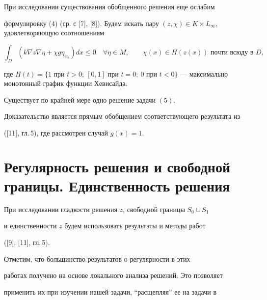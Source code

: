 При исследовании существования обобщенного решения еще ослабим


формулировку (4) (ср. с [7], [8]). Будем искать пару $(z,\chi) \in K


\times L_{\infty}$, удовлетворяющую соотношениям


\begin{equation}\label{5}


\int_D(k \nabla z \nabla \eta + \chi g \eta_{x_n}) dx \leq 0 \quad \forall


\eta \in M, \qquad \chi(x) \in H(z(x)) \text{ почти всюду в } D,


\end{equation}


где $H(t)=\{1\text{ при }t>0;\ [0,1]\text{ при }t=0;\ 0 \text{ при }


t<0 \}$ --- максимально монотонный график функции Хевисайда.





\begin{thm}


Существует по крайней мере одно решение задачи $(5)$.


\end{thm}





Доказательство является прямым обобщением соответствующего результата из


([11], гл.\,5), где рассмотрен случай $g(x) = 1$.





\section{Регулярность решения и свободной границы. Единственность решения}





При исследовании гладкости решения $z$, свободной границы $S_0 \cup S_1$


и единственности $z$ будем использовать результаты и методы работ


([9], [11], гл.\,5).


Отметим, что большинство результатов о регулярности в этих


работах получено на основе локального анализа решений. Это позволяет


применить их при изучении нашей задачи, ``расщепляя'' ее на задачи в


